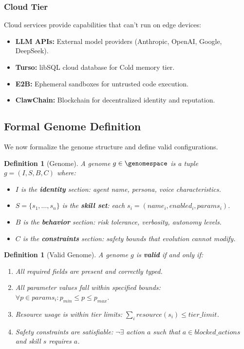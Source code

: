 \documentclass{article}
\newtheorem{definition}[theorem]{Definition}
\begin{document}
\subsubsection{Cloud Tier}

Cloud services provide capabilities that can't run on edge devices:

\begin{itemize}[leftmargin=*]
    \item \textbf{LLM APIs:} External model providers (Anthropic, OpenAI, Google, DeepSeek).
    \item \textbf{Turso:} libSQL cloud database for Cold memory tier.
    \item \textbf{E2B:} Ephemeral sandboxes for untrusted code execution.
    \item \textbf{ClawChain:} Blockchain for decentralized identity and reputation.
\end{itemize}

\subsection{Formal Genome Definition}

We now formalize the genome structure and define valid configurations.

\begin{definition}[Genome]
A genome $g \in \genomespace$ is a tuple $g = (I, S, B, C)$ where:
\begin{itemize}
    \item $I$ is the \textbf{identity} section: agent name, persona, voice characteristics.
    \item $S = \{s_1, \ldots, s_n\}$ is the \textbf{skill set}: each $s_i = (name_i, enabled_i, params_i)$.
    \item $B$ is the \textbf{behavior} section: risk tolerance, verbosity, autonomy levels.
    \item $C$ is the \textbf{constraints} section: safety bounds that evolution cannot modify.
\end{itemize}
\end{definition}

\begin{definition}[Valid Genome]
A genome $g$ is \textbf{valid} if and only if:
\begin{enumerate}
    \item All required fields are present and correctly typed.
    \item All parameter values fall within specified bounds: $\forall p \in params_i: p_{min} \leq p \leq p_{max}$.
    \item Resource usage is within tier limits: $\sum_i resource(s_i) \leq tier\_limit$.
    \item Safety constraints are satisfiable: $\neg \exists$ action $a$ such that $a \in blocked\_actions$ and skill $s$ requires $a$.
\end{enumerate}
\end{definition}
\end{document}
